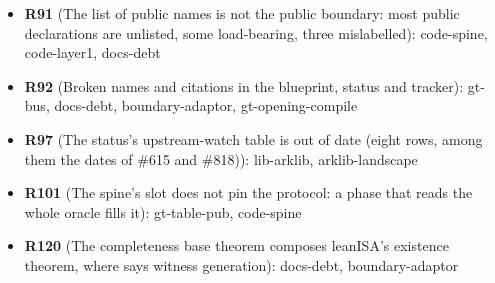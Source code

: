 \begin{itemize}
\item \textbf{R91} (The list of public names is not the public boundary: most public declarations are unlisted, some load-bearing, three mislabelled): code-spine, code-layer1, docs-debt
\item \textbf{R92} (Broken names and citations in the blueprint, status and tracker): gt-bus, docs-debt, boundary-adaptor, gt-opening-compile
\item \textbf{R97} (The status's upstream-watch table is out of date (eight rows, among them the dates of \#615 and \#818)): lib-arklib, arklib-landscape
\item \textbf{R101} (The spine's slot does not pin the protocol: a phase that reads the whole oracle fills it): gt-table-pub, code-spine
\item \textbf{R120} (The completeness base theorem composes leanISA's existence theorem, where  says witness generation): docs-debt, boundary-adaptor
\end{itemize}
\endgroup

